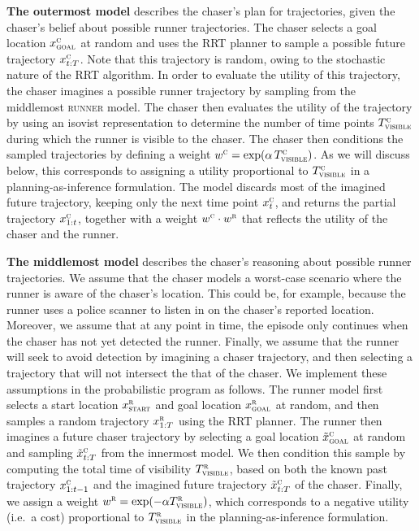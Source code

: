 \documentclass[twoside]{article}
\begin{document}
\textbf{The outermost model} describes the chaser's plan for trajectories, given the chaser's belief about possible runner trajectories. The chaser selects a goal location $x^\textsc{c}_\textsc{goal}$ at random and uses the RRT planner to sample a possible future trajectory $x^\textsc{c}_{t:T}$. Note that this trajectory is random, owing to the stochastic nature of the RRT algorithm. In order to evaluate the utility of this trajectory, the chaser imagines a possible runner trajectory by sampling from the middlemost \textsc{runner} model. The chaser then evaluates the utility of the trajectory by using an isovist representation to determine the number of time points $T^\textsc{c}_\textsc{visible}$ during which the runner is visible to the chaser. The chaser then conditions the sampled trajectories by defining a weight $w^\textsc{c} = \exp( \alpha \, T^\textsc{c}_\textsc{visible})$. As we will discuss below, this corresponds to assigning a utility proportional to $T^\textsc{c}_\textsc{visible}$ in a planning-as-inference formulation. The model discards most of the imagined future trajectory, keeping only the next time point $x^\textsc{c}_t$, and returns the partial trajectory $x^\textsc{c}_{1:t}$, together with a weight $w^\textsc{c} \cdot w^\textsc{r}$ that reflects the utility of the chaser and the runner.

\textbf{The middlemost model} describes the chaser's reasoning about possible runner trajectories. %
We assume that the chaser models a worst-case scenario where the runner is aware of the chaser's location. This could be, for example, because the runner uses a police scanner to listen in on the chaser's reported location.
Moreover, we assume that at any point in time, the episode only continues when the chaser has not yet detected the runner. Finally, we assume that the runner will seek to avoid detection by imagining a chaser trajectory, and then selecting a trajectory that will not intersect the that of the chaser. We implement these assumptions in the probabilistic program as follows. The runner model first selects a start location $x^\textsc{r}_\textsc{start}$ and goal location $x^\textsc{r}_\textsc{goal}$ at random, and then samples a random trajectory $x^\textsc{r}_{1:T}$ using the RRT planner. The runner then imagines a future chaser trajectory by selecting a goal location $\tilde{x}^\textsc{c}_\textsc{goal}$ at random and sampling $\tilde{x}^\textsc{c}_{t:T}$ from the innermost model. We then condition this sample by computing the total time of visibility $T^\textsc{r}_\textsc{visible}$, based on both the known past trajectory $x^\textsc{c}_{1:t-1}$ and the imagined future trajectory $\tilde{x}^\textsc{c}_{t:T}$ of the chaser. Finally, we assign a weight $w^\textsc{r} = \exp(-\alpha T^\textsc{r}_\textsc{visible})$, which corresponds to a negative utility (i.e.~a cost) proportional to $T^\textsc{r}_\textsc{visible}$ in the planning-as-inference formulation.
\end{document}
